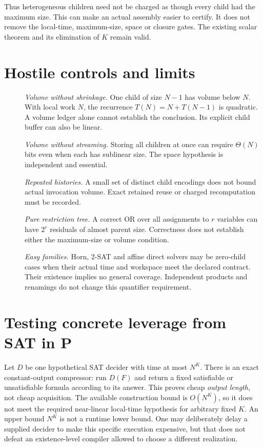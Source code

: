 \documentclass[11pt]{article}
\begin{document}
Thus heterogeneous children need not be charged as though every child
had the maximum size. This can make an actual assembly easier to certify.
It does not remove the local-time, maximum-size, space or closure gates.
The existing scalar theorem and its elimination of $K$ remain valid.

\section{Hostile controls and limits}
\begin{description}
\item[] \emph{Volume without shrinkage.} One child of size $N-1$ has
volume below $N$. With local work $N$, the recurrence
$T(N)=N+T(N-1)$ is quadratic. A volume ledger alone cannot establish the
conclusion. Its explicit child buffer can also be linear.
\item[] \emph{Volume without streaming.} Storing all children at once
can require $\Theta(N)$ bits even when each has sublinear size. The space
hypothesis is independent and essential.
\item[] \emph{Repeated histories.} A small set of distinct child encodings
does not bound actual invocation volume. Exact retained reuse or charged
recomputation must be recorded.
\item[] \emph{Pure restriction tree.} A correct OR over all assignments to
$r$ variables can have $2^r$ residuals of almost parent size. Correctness
does not establish either the maximum-size or volume condition.
\item[] \emph{Easy families.} Horn, 2-SAT and affine direct solvers may be
zero-child cases when their actual time and workspace meet the declared
contract. Their existence implies no general coverage. Independent
products and renamings do not change this quantifier requirement.
\end{description}

\section{Testing concrete leverage from SAT in P}
Let $D$ be one hypothetical SAT decider with time at most $N^K$.
There is an exact constant-output compressor: run $D(F)$ and return a
fixed satisfiable or unsatisfiable formula according to its answer.
This proves cheap \emph{output length}, not cheap acquisition. The
available construction bound is $O(N^K)$, so it does not meet the
required near-linear local-time hypothesis for arbitrary fixed $K$.
An upper bound $N^K$ is not a runtime lower bound. One may deliberately
delay a supplied decider to make this specific execution expensive, but
that does not defeat an existence-level compiler allowed to choose a
different realization.
\end{document}
